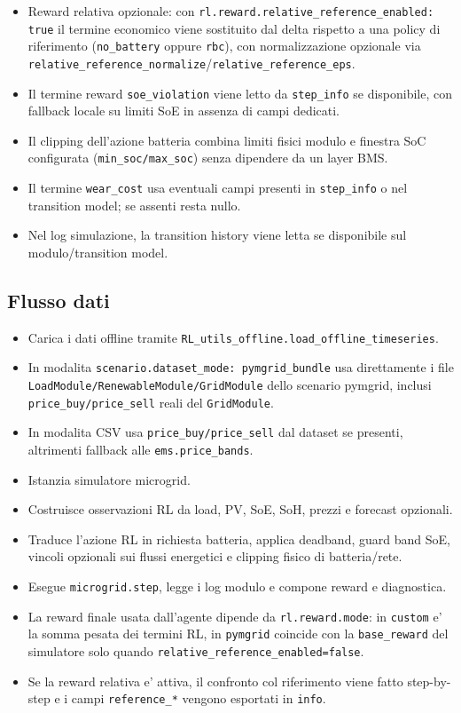 \begin{itemize}[leftmargin=1.2cm]
  policy di riferimento se la reward relativa e' attiva.
\item Reward relativa opzionale:
  con \texttt{rl.reward.relative\_reference\_enabled: true} il termine economico
  viene sostituito dal delta rispetto a una policy di riferimento
  (\texttt{no\_battery} oppure \texttt{rbc}), con normalizzazione opzionale
  via \texttt{relative\_reference\_normalize}/\texttt{relative\_reference\_eps}.
\item Il termine reward \texttt{soe\_violation} viene letto da \texttt{step\_info} se disponibile,
  con fallback locale su limiti SoE in assenza di campi dedicati.
\item Il clipping dell'azione batteria combina limiti fisici modulo e finestra SoC
  configurata (\texttt{min\_soc/max\_soc}) senza dipendere da un layer BMS.
\item Il termine \texttt{wear\_cost} usa eventuali campi presenti in \texttt{step\_info} o nel
  transition model; se assenti resta nullo.
\item Nel log simulazione, la transition history viene letta se disponibile sul modulo/transition model.
\end{itemize}

\subsection*{Flusso dati}
\begin{itemize}[leftmargin=1.2cm]
\item Carica i dati offline tramite \texttt{RL\_utils\_offline.load\_offline\_timeseries}.
\item In modalita \texttt{scenario.dataset\_mode: pymgrid\_bundle} usa direttamente i file
  \texttt{LoadModule/RenewableModule/GridModule} dello scenario pymgrid, inclusi
  \texttt{price\_buy/price\_sell} reali del \texttt{GridModule}.
\item In modalita CSV usa \texttt{price\_buy/price\_sell} dal dataset se presenti,
  altrimenti fallback alle \texttt{ems.price\_bands}.
\item Istanzia simulatore microgrid.
\item Costruisce osservazioni RL da load, PV, SoE, SoH, prezzi e forecast opzionali.
\item Traduce l'azione RL in richiesta batteria, applica deadband, guard band SoE,
  vincoli opzionali sui flussi energetici e clipping fisico di batteria/rete.
\item Esegue \texttt{microgrid.step}, legge i log modulo e compone reward e diagnostica.
\item La reward finale usata dall'agente dipende da \texttt{rl.reward.mode}:
  in \texttt{custom} e' la somma pesata dei termini RL, in \texttt{pymgrid}
  coincide con la \texttt{base\_reward} del simulatore solo quando
  \texttt{relative\_reference\_enabled=false}.
\item Se la reward relativa e' attiva, il confronto col riferimento viene fatto
  step-by-step e i campi \texttt{reference\_*} vengono esportati in \texttt{info}.
\end{itemize}

